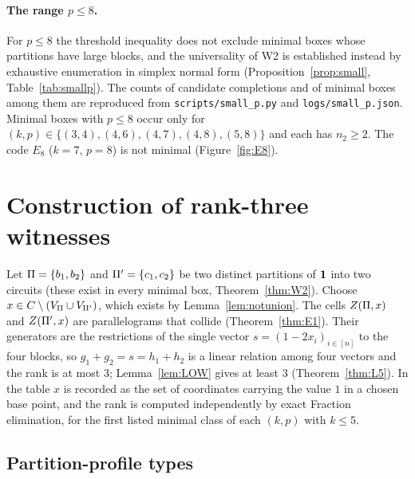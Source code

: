 \paragraph{The range $p\le8$.} For $p\le8$ the threshold inequality does not exclude minimal boxes whose partitions have large blocks, and the universality of W2 is established instead by exhaustive enumeration in simplex normal form (Proposition~\ref{prop:small}, Table~\ref{tab:smallp}). The counts of candidate completions and of minimal boxes among them are reproduced from \texttt{scripts/small\_p.py} and \texttt{logs/small\_p.json}. Minimal boxes with $p\le8$ occur only for $(k,p)\in\{(3,4),(4,6),(4,7),(4,8),(5,8)\}$ and each has $n_2\ge2$. The code $E_8$ ($k=7$, $p=8$) is not minimal (Figure~\ref{fig:E8}).

\section{Construction of rank-three witnesses}\label{app:J}

Let $\Pi=\{b_1,b_2\}$ and $\Pi'=\{c_1,c_2\}$ be two distinct partitions of $\mathbf 1$ into two circuits (these exist in every minimal box, Theorem~\ref{thm:W2}). Choose $x\in C\setminus(V_\Pi\cup V_{\Pi'})$, which exists by Lemma~\ref{lem:notunion}. The cells $Z(\Pi,x)$ and $Z(\Pi',x)$ are parallelograms that collide (Theorem~\ref{thm:E1}). Their generators are the restrictions of the single vector $s=(1-2x_i)_{i\in[n]}$ to the four blocks, so $g_1+g_2=s=h_1+h_2$ is a linear relation among four vectors and the rank is at most $3$; Lemma~\ref{lem:LOW} gives at least $3$ (Theorem~\ref{thm:L5}). In the table $x$ is recorded as the set of coordinates carrying the value $1$ in a chosen base point, and the rank is computed independently by exact Fraction elimination, for the first listed minimal class of each $(k,p)$ with $k\le5$.

\begin{table}[ht]
\centering\scriptsize
{}
\caption{Rank-three witnesses constructed as in Appendix~\ref{app:J} (first listed class per $(k,p)$).}
\end{table}

\subsection*{Partition-profile types}\label{app:J2}

